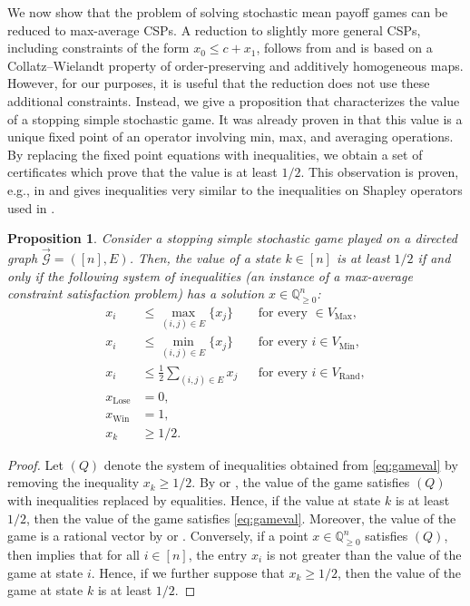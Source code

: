 \documentclass[11pt]{article}
\newtheorem{proposition}[theorem]{Proposition}
\theoremstyle{definition}
\theoremstyle{remark}
\newcommand{\Q}{\mathbb{Q}}
\newcommand{\dgraph}{\vec{\mathcal{G}}}
\newcommand{\vertices}{V}
\newcommand{\edges}{E}
\newcommand{\Max}{\mathrm{Max}}
\newcommand{\Min}{\mathrm{Min}}
\newcommand{\Rand}{\mathrm{Rand}}
\newcommand{\Maxvertices}{\vertices_{\Max}}
\newcommand{\Minvertices}{\vertices_{\Min}}
\newcommand{\Randvertices}{\vertices_{\Rand}}
\newcommand{\Win}{\mathrm{Win}}
\newcommand{\Lose}{\mathrm{Lose}}
\begin{document}
 We now show that the problem of solving stochastic mean payoff games can be reduced to max-average CSPs. 
 A reduction to slightly more general CSPs, including constraints of the form $x_0 \le c + x_1$, follows from \cite[Theorem~18]{issac2016jsc} and is based on a Collatz--Wielandt property of order-preserving and additively homogeneous maps. 
 However, for our purposes, it is useful that the reduction does not use these additional constraints.
 Instead, we give a proposition that characterizes the value of a stopping simple stochastic game. 
 It was already proven in \cite{condon} that this value is a unique fixed point of an operator involving min, max, and averaging operations. By replacing the fixed point equations with inequalities, we obtain a set of certificates which prove that the value is at least $1/2$. This observation is proven, e.g., in \cite{stochasticchapter} and gives inequalities very similar to the inequalities on Shapley operators used in \cite{issac2016jsc}.

 
\begin{proposition}\label{value_ineq}
Consider a stopping simple stochastic game played on a directed graph $\dgraph=([n],E)$. Then, the value of a state $k \in [n]$ is at least $1/2$ if and only if the following system of inequalities (an instance of a max-average constraint satisfaction problem) has a solution $x 
\in \Q_{\geq 0}^n$: 
\begin{equation}\label{eq:gameval}
\begin{aligned}
 x_i &\le \max_{(i,j) \in \edges}\{x_j\} && \text{for every } \in \Maxvertices, \\
 x_i &\le \min_{(i,j) \in \edges}\{x_j\} && \text{for every }  i \in \Minvertices,  \\
x_i &\le \frac{1}{2}\sum_{(i,j) \in \edges}x_{j}  && \text{for every } i \in \Randvertices,\\
x_{\Lose} &= 0,  \\
x_{\Win} &= 1,\\
x_k &\ge 1/2.
\end{aligned}
\end{equation}
\end{proposition}
\begin{proof}
Let $(Q)$ denote the system of inequalities obtained from \cref{eq:gameval} by removing the inequality $x_k \ge 1/2$. By \cite{condon} or \cite[Theorem~77]{stochasticchapter}, the value of the game satisfies $(Q)$ with inequalities replaced by equalities. Hence, if the value at state $k$ is at least $1/2$, then the value of the game satisfies \cref{eq:gameval}. Moreover, the value of the game is a rational vector by \cite[Lemma~2]{condon} or \cite[Corollary~18]{stochasticchapter}. Conversely, if a point $x \in \Q_{\geq 0}^n$ satisfies $(Q)$, then \cite[Lemma~83]{stochasticchapter} implies that for all $i \in [n]$, the entry $x_i$ is not greater than the value of the game at state $i$. Hence, if we further suppose that $x_k \ge 1/2$, then the value of the game at state $k$ is at least $1/2$.
\end{proof}
\end{document}
